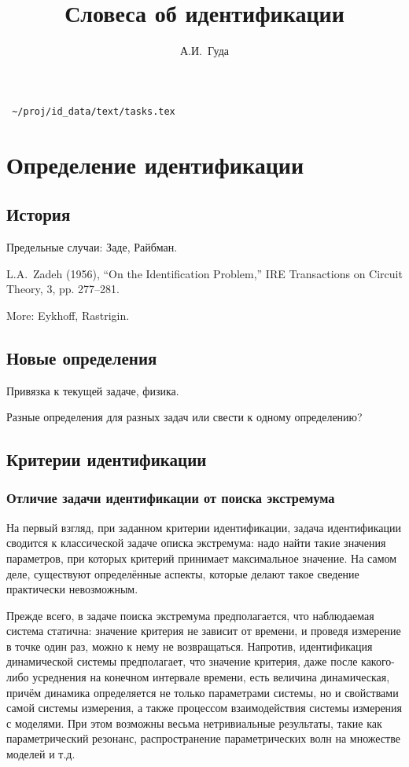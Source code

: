 \documentclass[a4paper,12pt]{article}
\title{Словеса об идентификации}
\author{А.И.~Гуда}
\begin{document}
{ \tiny \verb! ~/proj/id_data/text/tasks.tex! }

\tableofcontents


\section{Определение идентификации}

\subsection{История}

Предельные случаи: Заде, Райбман.

L.A.~Zadeh (1956), ``On the Identification Problem,''
IRE Transactions on Circuit Theory, 3, pp.  277--281.

More: Eykhoff, Rastrigin.

\subsection{Новые определения}

Привязка к текущей задаче, физика.

Разные определения для разных задач или свести к одному определению?

\subsection{Критерии идентификации}

\subsubsection{Отличие задачи идентификации от поиска экстремума}

На первый взгляд, при заданном критерии идентификации, задача идентификации
сводится к классической задаче описка экстремума: надо найти такие значения
параметров, при которых критерий принимает максимальное значение.
На самом деле, существуют определённые аспекты, которые делают такое
сведение практически невозможным.

Прежде всего, в задаче поиска
экстремума предполагается, что наблюдаемая система статична:
значение критерия не зависит от времени, и проведя измерение
в точке один раз, можно к нему не возвращаться.
Напротив, идентификация динамической системы предполагает,
что значение критерия, даже после какого-либо усреднения на конечном
интервале времени, есть величина динамическая, причём динамика определяется
не только параметрами системы, но и свойствами самой системы измерения,
а также процессом взаимодействия системы измерения с моделями. При этом
возможны весьма нетривиальные результаты, такие как параметрический
резонанс, распространение параметрических волн на множестве моделей и т.д.
\end{document}
